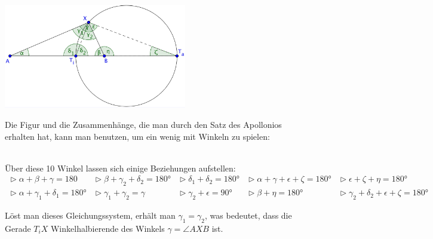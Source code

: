 \begin{small}
\begin{Bemerkung}
  \begin{minipage}{0.5\textwidth}
    \includegraphics[width=8cm]{kap5/Apollinius_Winkel}
  \end{minipage}
  \begin{minipage}{0.5\textwidth}
    Die Figur und die Zusammenhänge, die man durch den Satz des Apollonios erhalten hat, kann man benutzen, um ein wenig mit Winkeln zu spielen:
  \end{minipage}\\
  Über diese 10 Winkel lassen sich einige Beziehungen aufstellen:
  $$\begin{array}{rcccl}
    \vartriangleright \alpha + \beta + \gamma = 180  & \vartriangleright \beta + \gamma_{2} + \delta_{2} = 180°  & \vartriangleright \delta_{1} + \delta_{2} = 180°  & \vartriangleright \alpha + \gamma + \epsilon + \zeta = 180°  &\vartriangleright \epsilon + \zeta + \eta = 180°\\
    \vartriangleright \alpha + \gamma_{1} + \delta_{1} = 180°  & \vartriangleright \gamma_{1} + \gamma_{2} = \gamma  & \vartriangleright \gamma_{2} + \epsilon = 90° & \vartriangleright \beta + \eta = 180°  &\vartriangleright \gamma_{2} + \delta_{2} + \epsilon + \zeta = 180°
  \end{array}$$
  
  Löst man dieses Gleichungssystem, erhält man $\gamma_{1} = \gamma_{2}$, was bedeutet, dass die Gerade $T_{i}X$ Winkelhalbierende des Winkels $\gamma = \angle AXB$ ist.
\end{Bemerkung}

\end{small}
